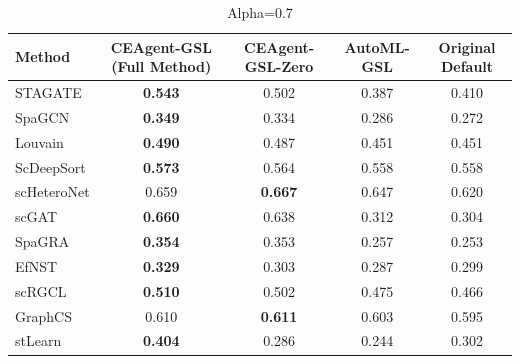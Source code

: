 \begin{table}[htbp]
\centering
\begin{tabular}{lcccc}
\toprule
Method & CEAgent-GSL (Full Method) & CEAgent-GSL-Zero & AutoML-GSL & Original Default \\
\midrule
STAGATE & \textbf{0.543} & 0.502 & 0.387 & 0.410 \\
SpaGCN & \textbf{0.349} & 0.334 & 0.286 & 0.272 \\
Louvain & \textbf{0.490} & 0.487 & 0.451 & 0.451 \\
ScDeepSort & \textbf{0.573} & 0.564 & 0.558 & 0.558 \\
scHeteroNet & 0.659 & \textbf{0.667} & 0.647 & 0.620 \\
scGAT & \textbf{0.660} & 0.638 & 0.312 & 0.304 \\
SpaGRA & \textbf{0.354} & 0.353 & 0.257 & 0.253 \\
EfNST & \textbf{0.329} & 0.303 & 0.287 & 0.299 \\
scRGCL & \textbf{0.510} & 0.502 & 0.475 & 0.466 \\
GraphCS & 0.610 & \textbf{0.611} & 0.603 & 0.595 \\
stLearn & \textbf{0.404} & 0.286 & 0.244 & 0.302 \\
\bottomrule
\end{tabular}
\caption{Alpha=0.7}
\label{tab:exp1}
\end{table}
